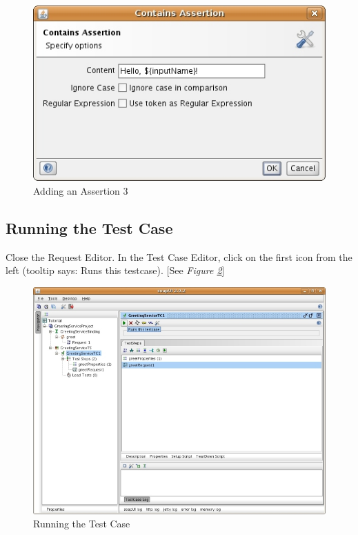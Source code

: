 \documentclass{article}
\begin{document}
\begin{figure}[!hbp]
\begin{center}
\includegraphics{fig/ARC1PythonDGDraft-img12.jpg}
\caption{Adding an Assertion 3}
\label{fig:assert3}
\end{center}
\end{figure}

\subsection{Running the Test Case}
\label{sec:runtc}

Close the Request Editor. In the Test Case Editor, click on the first
icon from the left (tooltip says: Runs this testcase). [See 
\emph{Figure \ref{fig:runtc}}]

\begin{figure}[!hbp]
\begin{center}
\includegraphics{fig/ARC1PythonDGDraft-img13_resize.jpg}
\caption{Running the Test Case}
\label{fig:runtc}
\end{center}
\end{figure}
\end{document}
